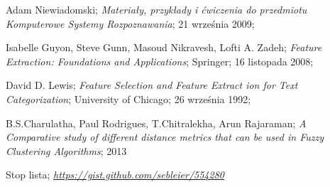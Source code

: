 \documentclass{classrep}
\begin{document}
\begin{thebibliography}{0}

 Adam Niewiadomski;
\textsl{Materiały, przykłady i ćwiczenia do przedmiotu
Komputerowe Systemy Rozpoznawania}; 21 września 2009;

 Isabelle Guyon, Steve Gunn, Masoud Nikravesh, Lofti A. Zadeh;
\textsl{Feature Extraction: Foundations and Applications}; Springer; 16 listopada 2008;

 David D. Lewis;
\textsl{Feature Selection and Feature Extract ion for Text Categorization}; University of Chicago; 26 września 1992;

 B.S.Charulatha, Paul Rodrigues, T.Chitralekha, Arun Rajaraman;
\textsl{A Comparative study of different distance metrics that can be used in Fuzzy Clustering Algorithms}; 2013

 Stop lista;
\textsl{\url{https://gist.github.com/sebleier/554280}}

\end{thebibliography}
\end{document}
